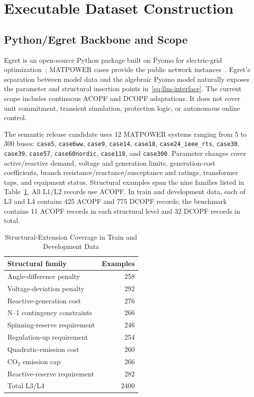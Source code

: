 \documentclass[lettersize,journal]{IEEEtran}
\begin{document}
\section{Executable Dataset Construction}
\subsection{Python/Egret Backbone and Scope}
Egret is an open-source Python package built on Pyomo for electric-grid optimization~\cite{bynum2021egret,pyomoBook}; MATPOWER cases provide the public network instances~\cite{zimmerman2011matpower}. Egret's separation between model data and the algebraic Pyomo model naturally exposes the parameter and structural insertion points in~\eqref{eq:llm-interface}. The current scope includes continuous ACOPF and DCOPF adaptations. It does not cover unit commitment, transient simulation, protection logic, or autonomous online control.

The semantic release candidate uses 12 MATPOWER systems ranging from 5 to 300 buses: \texttt{case5}, \texttt{case6ww}, \texttt{case9}, \texttt{case14}, \texttt{case18}, \texttt{case24\_ieee\_rts}, \texttt{case30}, \texttt{case39}, \texttt{case57}, \texttt{case60nordic}, \texttt{case118}, and \texttt{case300}. Parameter changes cover active/reactive demand, voltage and generation limits, generation-cost coefficients, branch resistance/reactance/susceptance and ratings, transformer taps, and equipment status. Structural examples span the nine families listed in Table~\ref{tab:structures}. All L1/L2 records use ACOPF. In train and development data, each of L3 and L4 contains 425 ACOPF and 775 DCOPF records; the benchmark contains 11 ACOPF records in each structural level and 32 DCOPF records in total.

\begin{table}[!t]
\caption{Structural-Extension Coverage in Train and Development Data}
\label{tab:structures}
\centering
\footnotesize
\begin{tabular}{@{}lr@{}}
\toprule
Structural family & Examples \\
\midrule
Angle-difference penalty & 258 \\
Voltage-deviation penalty & 292 \\
Reactive-generation cost & 276 \\
N--1 contingency constraints & 266 \\
Spinning-reserve requirement & 246 \\
Regulation-up requirement & 254 \\
Quadratic-emission cost & 260 \\
CO$_2$ emission cap & 266 \\
Reactive-reserve requirement & 282 \\
\midrule
Total L3/L4 & 2400 \\
\bottomrule
\end{tabular}
\end{table}
\end{document}
